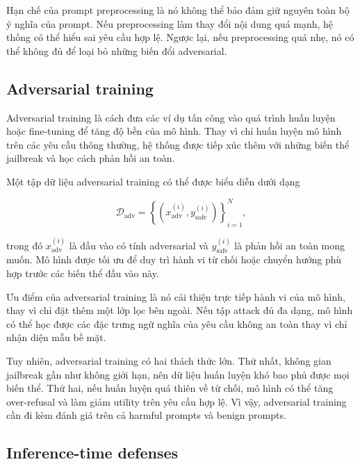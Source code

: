 Hạn chế của prompt preprocessing là nó không thể bảo đảm giữ nguyên toàn
bộ ý nghĩa của prompt. Nếu preprocessing làm thay đổi nội dung quá mạnh,
hệ thống có thể hiểu sai yêu cầu hợp lệ. Ngược lại, nếu preprocessing quá
nhẹ, nó có thể không đủ để loại bỏ những biến đổi adversarial.

\subsection{Adversarial training}
\label{subsec:adversarial-training}

Adversarial training là cách đưa các ví dụ tấn công vào quá trình huấn
luyện hoặc fine-tuning để tăng độ bền của mô hình. Thay vì chỉ huấn luyện
mô hình trên các yêu cầu thông thường, hệ thống được tiếp xúc thêm với
những biến thể jailbreak và học cách phản hồi an toàn.

Một tập dữ liệu adversarial training có thể được biểu diễn dưới dạng

\begin{equation}
    \mathcal{D}_{\mathrm{adv}}
    =
    \left\{
        (x_{\mathrm{adv}}^{(i)}, y_{\mathrm{safe}}^{(i)})
    \right\}_{i=1}^{N},
    \label{eq:adversarial-training-dataset}
\end{equation}

trong đó $x_{\mathrm{adv}}^{(i)}$ là đầu vào có tính adversarial và
$y_{\mathrm{safe}}^{(i)}$ là phản hồi an toàn mong muốn. Mô hình được tối
ưu để duy trì hành vi từ chối hoặc chuyển hướng phù hợp trước các biến thể
đầu vào này.

Ưu điểm của adversarial training là nó cải thiện trực tiếp hành vi của mô
hình, thay vì chỉ đặt thêm một lớp lọc bên ngoài. Nếu tập attack đủ đa
dạng, mô hình có thể học được các đặc trưng ngữ nghĩa của yêu cầu không an
toàn thay vì chỉ nhận diện mẫu bề mặt.

Tuy nhiên, adversarial training có hai thách thức lớn. Thứ nhất, không
gian jailbreak gần như không giới hạn, nên dữ liệu huấn luyện khó bao phủ
được mọi biến thể. Thứ hai, nếu huấn luyện quá thiên về từ chối, mô hình
có thể tăng over-refusal và làm giảm utility trên yêu cầu hợp lệ. Vì vậy,
adversarial training cần đi kèm đánh giá trên cả harmful prompts và benign
prompts.

\subsection{Inference-time defenses}
\label{subsec:inference-time-defenses}

